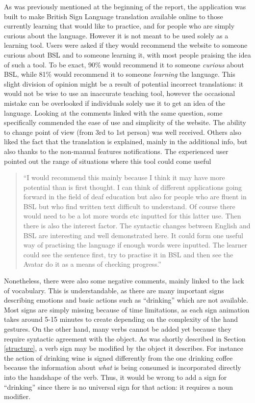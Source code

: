 \documentclass[12pt]{ociamthesis}  %
\begin{document}
As was previously mentioned at the beginning of the report, the application was built to make British Sign Language translation available online to those currently learning that would like to practice, and for people who are simply curious about the language. However it is not meant to be used solely as a learning tool. Users were asked if they would recommend the website to someone curious about BSL and to someone learning it, with most people praising the idea of such a tool. To be exact, 90\% would recommend it to someone \textit{curious} about BSL, while 81\% would recommend it to someone \textit{learning} the language. This slight division of opinion might be a result of potential incorrect translations: it would not be wise to use an inaccurate teaching tool, however the occasional mistake can be overlooked if individuals solely use it to get an idea of the language. Looking at the comments linked with the same question, some specifically commended the ease of use and simplicity of the website. The ability to change point of view (from 3rd to 1st person) was well received. Others also liked the fact that the translation is explained, mainly in the additional info, but also thanks to the non-manual features notifications. The experienced user pointed out the range of situations where this tool could come useful
\begin{quote}
``I would recommend this mainly because I think it may have more potential than is first thought. I can think of different applications going forward in the field of deaf education but also for people who are fluent in BSL but who find written text difficult to understand. Of course there would need to be a lot more words etc inputted for this latter use. Then there is also the interest factor. The syntactic changes between English and BSL are interesting and well demonstrated here. It could form one useful way of practising the language if enough words were inputted. The learner could see the sentence first, try to practise it in BSL and then see the Avatar do it as a means of checking progress.''
\end{quote} 

Nonetheless, there were also some negative comments, mainly linked to the lack of vocabulary. This is understandable, as there are many important signs describing emotions and basic actions such as ``drinking'' which are not available. Most signs are simply missing because of time limitations, as each sign animation takes around 5-15 minutes to create depending on the complexity of the hand gestures. On the other hand, many  verbs cannot be added yet because they require syntactic agreement with the object. As was shortly described in Section \ref{structure}, a verb sign may be modified by the object it describes. For instance the action of drinking wine is signed differently from the one drinking coffee because the information about \textit{what} is being consumed is incorporated directly into the handshape of the verb. Thus, it would be wrong to add a sign for ``drinking'' since there is no universal sign for that action: it requires a noun modifier. 
\end{document}
